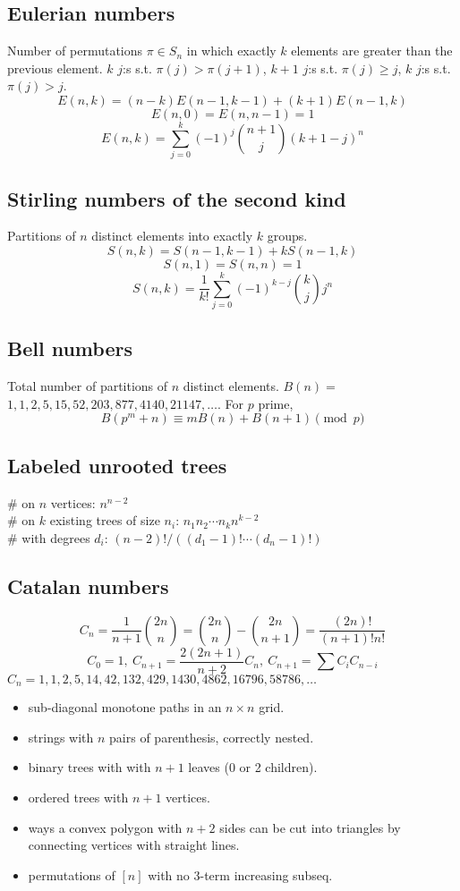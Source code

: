 	\subsection{Eulerian numbers}
		Number of permutations $\pi \in S_n$ in which exactly $k$ elements are greater than the previous element. $k$ $j$:s s.t. $\pi(j)>\pi(j+1)$, $k+1$ $j$:s s.t. $\pi(j)\geq j$, $k$ $j$:s s.t. $\pi(j)>j$.
		$$E(n,k) = (n-k)E(n-1,k-1) + (k+1)E(n-1,k)$$
		$$E(n,0) = E(n,n-1) = 1$$
		$$E(n,k) = \sum_{j=0}^k(-1)^j\binom{n+1}{j}(k+1-j)^n$$

	\subsection{Stirling numbers of the second kind}
		Partitions of $n$ distinct elements into exactly $k$ groups.
		$$S(n,k) = S(n-1,k-1) + k S(n-1,k)$$
		$$S(n,1) = S(n,n) = 1$$
		$$S(n,k) = \frac{1}{k!}\sum_{j=0}^k (-1)^{k-j}\binom{k}{j}j^n$$

	\subsection{Bell numbers}
		Total number of partitions of $n$ distinct elements. $B(n) =$
		$1, 1, 2, 5, 15, 52, 203, 877, 4140, 21147, \dots$. For $p$ prime,
		\[ B(p^m+n)\equiv mB(n)+B(n+1) \pmod{p} \]

	\subsection{Labeled unrooted trees}
		\# on $n$ vertices: $n^{n-2}$ \\
		\# on $k$ existing trees of size $n_i$: $n_1n_2\cdots n_k n^{k-2}$ \\
		\# with degrees $d_i$: $(n-2)! / ((d_1-1)! \cdots (d_n-1)!)$

	\subsection{Catalan numbers}
		\[ C_n=\frac{1}{n+1}\binom{2n}{n}= \binom{2n}{n}-\binom{2n}{n+1} = \frac{(2n)!}{(n+1)!n!} \]
		\[ C_0=1,\ C_{n+1} = \frac{2(2n+1)}{n+2}C_n,\ C_{n+1}=\sum C_iC_{n-i} \]
		${C_n = 1, 1, 2, 5, 14, 42, 132, 429, 1430, 4862, 16796, 58786, \dots}$
		\begin{itemize}[noitemsep]
			\item sub-diagonal monotone paths in an $n\times n$ grid.
			\item strings with $n$ pairs of parenthesis, correctly nested.
			\item binary trees with with $n+1$ leaves (0 or 2 children).
			\item ordered trees with $n+1$ vertices.
			\item ways a convex polygon with $n+2$ sides can be cut into triangles by connecting vertices with straight lines.
			\item permutations of $[n]$ with no 3-term increasing subseq.
		\end{itemize}

